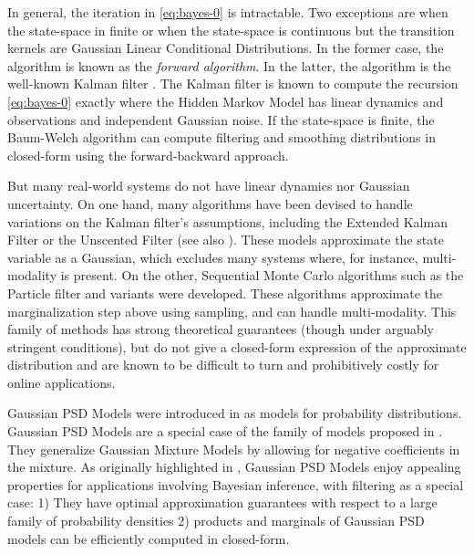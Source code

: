 In general, the iteration in \cref{eq:bayes-0} is intractable. Two exceptions are when the state-space in finite or when the state-space is continuous but the transition kernels are Gaussian Linear Conditional Distributions. In the former case, the algorithm is known as the \textit{forward algorithm}. In the latter, the algorithm is the well-known Kalman filter \cite{kalman-bucy}. The Kalman filter is known to compute the recursion \cref{eq:bayes-0} exactly where the Hidden Markov Model has linear dynamics and observations and independent Gaussian noise.
If the state-space is finite, the Baum-Welch algorithm can compute filtering and smoothing distributions in closed-form using the forward-backward approach.

But many real-world systems do not have linear dynamics nor Gaussian uncertainty. On one hand, many algorithms have been devised to handle variations on the Kalman filter's assumptions, including the Extended Kalman Filter or the Unscented Filter \citep{ukf} (see also \cite{sarkka}). These models approximate the state variable as a Gaussian, which excludes many systems where, for instance, multi-modality is present. On the other, Sequential Monte Carlo algorithms such as the Particle filter and variants were developed. These algorithms approximate the marginalization step above using sampling, and can handle multi-modality. This family of methods has strong theoretical guarantees (though under arguably stringent conditions), but do not give a closed-form expression of the approximate distribution and are known to be difficult to turn and prohibitively costly for online applications.

Gaussian PSD Models were introduced in \cite{ciliberto2021} as models for probability distributions. Gaussian PSD Models are a special case of the family of models proposed in \cite{ulysse-non-negative}. They generalize Gaussian Mixture Models by allowing for negative coefficients in the mixture. As originally highlighted in \cite{ciliberto2021}, Gaussian PSD Models enjoy appealing properties for applications involving Bayesian inference, with filtering as a special case: 1) They have optimal approximation guarantees with respect to a large family of probability densities 2) products and marginals of Gaussian PSD models can be efficiently computed in closed-form.


